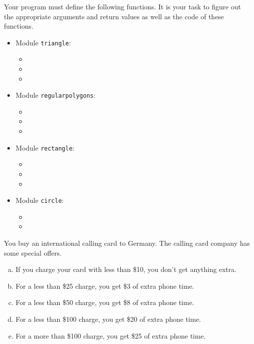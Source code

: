 \documentclass[11pt]{cselabheader}
\begin{document}
{\begin{ex}[geometry.py]
  Your program must define the following functions. It is your task to figure
  out the appropriate arguments and return values as well as the code of these
  functions.
  \begin{multicols}{2}
    \begin{itemize}
      \item Module \texttt{triangle}:
        \begin{itemize}
          \item {}
          \item {}
          \item {}
        \end{itemize}
      \item Module \texttt{regularpolygons}:
        \begin{itemize}
          \item {}
          \item {}
          \item {}
        \end{itemize}
      \item Module \texttt{rectangle}:
        \begin{itemize}
          \item{}
          \item {}
          \item {}
        \end{itemize}
      \item Module \texttt{circle}:
        \begin{itemize}
          \item {}
          \item {}
        \end{itemize}
    \end{itemize}
  \end{multicols}
\end{ex}

\begin{ex}[calls.py] You buy an international calling card to Germany. The
  calling card company has some special offers.

    \begin{enumerate}[(a)]
      \item If you charge your card with less than \$10, you don't get anything
        extra.
      \item For a less than \$25 charge, you get \$3 of extra phone time.
      \item For a less than \$50 charge, you get \$8 of extra phone time.
      \item For a less than \$100 charge, you get \$20 of extra phone time.
      \item For a more than \$100 charge, you get \$25 of extra phone time.
    \end{enumerate}


\end{ex}}
\end{document}
